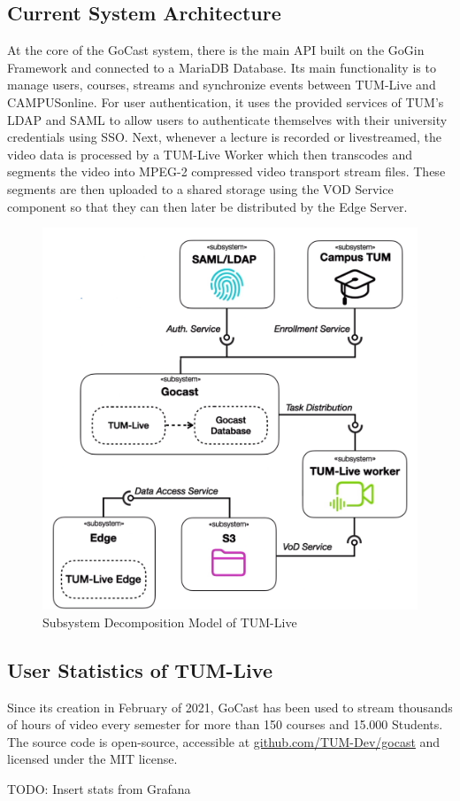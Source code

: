 \subsection{Current System Architecture}

At the core of the GoCast system, there is the main \ac{API} built on the GoGin Framework and connected to a MariaDB Database. Its main functionality is to manage users, courses, streams and synchronize events between TUM-Live and CAMPUSonline. For user authentication, it uses the provided services of \ac{TUM}'s \ac{LDAP} and \ac{SAML} to allow users to authenticate themselves with their university credentials using \ac{SSO}. 
Next, whenever a lecture is recorded or livestreamed, the video data is processed by a TUM-Live Worker which then transcodes and segments the video into MPEG-2 compressed video transport stream files. These segments are then uploaded to a shared storage using the VOD Service component so that they can then later be distributed by the Edge Server.

\begin{figure}[htpb]
    \centering
    \includegraphics[width=320pt]{images/OldDeploymentDiagram.png}
    \caption[Subsystem Decomposition]{Subsystem Decomposition Model of TUM-Live}\label{fig:old-system-architecture}
\end{figure}

\subsection{User Statistics of TUM-Live}\label{subsection:user-stats-tumlive}

Since its creation in February of 2021, GoCast has been used to stream thousands of hours of video every semester for more than 150 courses and 15.000 Students. The source code is open-source, accessible at \href{https://github.com/TUM-Dev/gocast}{github.com/TUM-Dev/gocast} and licensed under the MIT license.

TODO: Insert stats from Grafana
